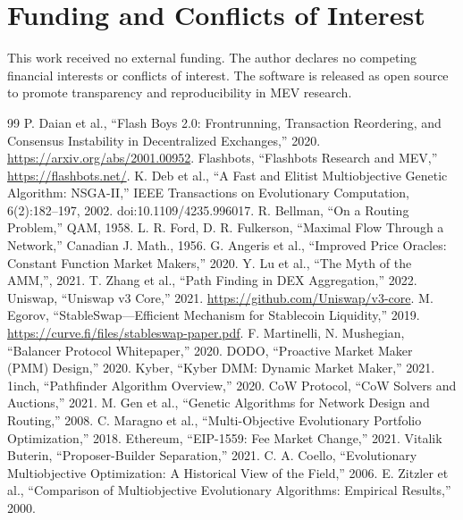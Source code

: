\documentclass[11pt]{article}
\newcommand{\1}{\mathbf{1}}  %
\begin{document}
\section*{Funding and Conflicts of Interest}
This work received no external funding. The author declares no competing financial interests or conflicts of interest. The software is released as open source to promote transparency and reproducibility in MEV research.

\begin{thebibliography}{99}
 P. Daian et al., ``Flash Boys 2.0: Frontrunning, Transaction Reordering, and Consensus Instability in Decentralized Exchanges,'' 2020. \url{https://arxiv.org/abs/2001.00952}.
 Flashbots, ``Flashbots Research and MEV,'' \url{https://flashbots.net/}.
 K. Deb et al., ``A Fast and Elitist Multiobjective Genetic Algorithm: NSGA-II,'' IEEE Transactions on Evolutionary Computation, 6(2):182--197, 2002. doi:10.1109/4235.996017.
 R. Bellman, ``On a Routing Problem,'' QAM, 1958.
 L. R. Ford, D. R. Fulkerson, ``Maximal Flow Through a Network,'' Canadian J. Math., 1956.
 G. Angeris et al., ``Improved Price Oracles: Constant Function Market Makers,'' 2020.
 Y. Lu et al., ``The Myth of the AMM,'', 2021.
 T. Zhang et al., ``Path Finding in DEX Aggregation,'' 2022.
 Uniswap, ``Uniswap v3 Core,'' 2021. \url{https://github.com/Uniswap/v3-core}.
 M. Egorov, ``StableSwap—Efficient Mechanism for Stablecoin Liquidity,'' 2019. \url{https://curve.fi/files/stableswap-paper.pdf}.
 F. Martinelli, N. Mushegian, ``Balancer Protocol Whitepaper,'' 2020.
 DODO, ``Proactive Market Maker (PMM) Design,'' 2020.
 Kyber, ``Kyber DMM: Dynamic Market Maker,'' 2021.
 1inch, ``Pathfinder Algorithm Overview,'' 2020.
 CoW Protocol, ``CoW Solvers and Auctions,'' 2021.
 M. Gen et al., ``Genetic Algorithms for Network Design and Routing,'' 2008.
 C. Maragno et al., ``Multi-Objective Evolutionary Portfolio Optimization,'' 2018.
 Ethereum, ``EIP-1559: Fee Market Change,'' 2021.
 Vitalik Buterin, ``Proposer-Builder Separation,'' 2021.
 C. A. Coello, ``Evolutionary Multiobjective Optimization: A Historical View of the Field,'' 2006.
 E. Zitzler et al., ``Comparison of Multiobjective Evolutionary Algorithms: Empirical Results,'' 2000.

\end{thebibliography}
\end{document}
